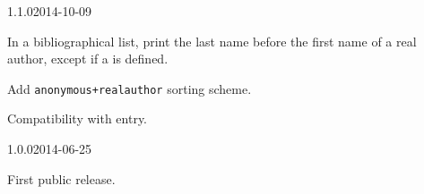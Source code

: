 \documentclass{ltxdockit}[2011/03/25]
\begin{document}
\begin{changelog}
\begin{release}{1.1.0}{2014-10-09}
\item In a bibliographical list, print the last name before the first name of a real author, except if a  is defined.
\item Add \verb|anonymous+realauthor| sorting scheme.   
\item Compatibility with  entry. 
\end{release}

\begin{release}{1.0.0}{2014-06-25}
\item First public release.
\end{release}
\end{changelog}
\end{document}
